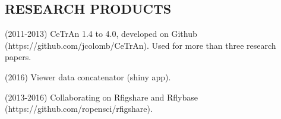 %

\newpage

%
\subsection*{RESEARCH PRODUCTS}



\begin{itemize}
\begin{sloppypar}
%
\item(2011-2013) CeTrAn 1.4 to 4.0, 
developed on Github (https://github.com/jcolomb/CeTrAn).
Used for more than three research papers.

\item(2016) Viewer data concatenator (shiny app).

\item(2013-2016) Collaborating on Rfigshare and Rflybase (https://github.com/ropensci/rfigshare).

%
%
\end{sloppypar}
\end{itemize}




